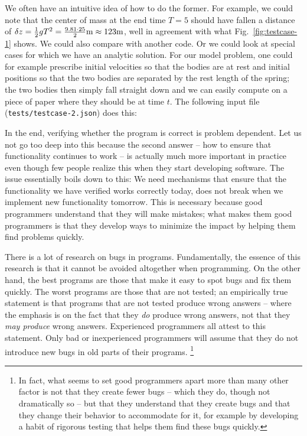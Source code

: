 \documentclass{article}
\begin{document}
We often have an intuitive idea of how to do the former. For example, we could
note that the center of mass at the end time $T=5$ should have fallen a
distance of $\delta z=\frac 12 g T^2=\frac{9.81 \cdot 25}{2}\textrm m\approx
123\textrm{m}$, well in agreement with what Fig.~\ref{fig:testcase-1} shows. We
could also compare with another code. Or we could look at special cases for
which we have 
an analytic solution. For our model problem, one could for example prescribe
initial velocities so that the bodies are at rest and initial positions so
that the two bodies are separated by the rest length of the spring; the two
bodies then simply fall straight down and we can easily compute on a piece of
paper where they should be at time $t$. The following input file
(\texttt{tests/testcase-2.json}) does this:


In the end, verifying whether the program is correct is problem dependent. Let
us not go too deep into this because the second answer -- how to ensure that
functionality continues to work -- is actually much more important in practice
even though few people realize this when they start developing software. The
issue essentially boils down to this: We need mechanisms that ensure that
the functionality we have verified works correctly today, does not break when
we implement new functionality tomorrow. This is necessary because good programmers
understand that they will make mistakes; what makes them good programmers is
that they develop ways to minimize the impact by helping them find problems
quickly. 

There is a lot of research on bugs in programs. Fundamentally, the essence of
this research is that it cannot be avoided altogether when programming. On the
other hand, the best programs are those that make it easy to spot bugs and fix
them quickly. The worst programs are those that are not tested; an empirically
true statement is that programs that are not tested produce wrong answers --
where the emphasis is on the fact that they \textit{do} produce wrong answers,
not that they \textit{may produce} wrong answers. Experienced programmers all
attest to this statement. Only bad or inexperienced programmers will assume
that they do not introduce new bugs in old parts of their programs.%
\footnote{In fact, what seems to set good programmers apart more than many
  other factor is not that they create fewer bugs -- which they do, though not
  dramatically so -- but that they understand that they create bugs and that
  they change their behavior to accommodate for it, for example by developing
  a habit of rigorous testing that helps them find these bugs quickly.}
\end{document}
